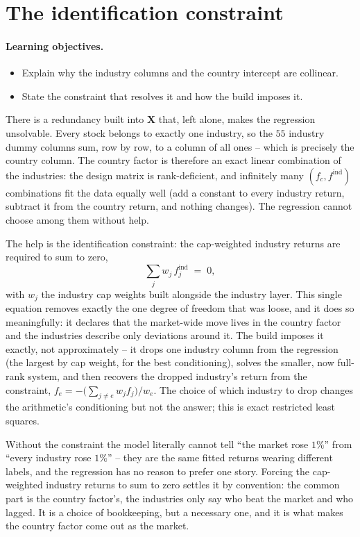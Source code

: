 \documentclass[11pt]{article}
\theoremstyle{definition}
\theoremstyle{plain}
\theoremstyle{remark}
\newcommand{\Xmat}{\mathbf{X}}
\begin{document}
\section{The identification constraint}\label{sec:constraint}

\paragraph{Learning objectives.}
\begin{itemize}[leftmargin=1.4em,topsep=2pt]
  \item Explain why the industry columns and the country intercept are collinear.
  \item State the constraint that resolves it and how the build imposes it.
\end{itemize}

There is a redundancy built into $\Xmat$ that, left alone, makes the regression unsolvable. Every stock belongs to exactly one industry, so the $55$ industry dummy columns sum, row by row, to a column of all ones -- which is precisely the country column. The country factor is therefore an exact linear combination of the industries: the design matrix is rank-deficient, and infinitely many $(f_c, f^{\text{ind}})$ combinations fit the data equally well (add a constant to every industry return, subtract it from the country return, and nothing changes). The regression cannot choose among them without help.

The help is the identification constraint: the cap-weighted industry returns are required to sum to zero,
\[
\sum_{j} w_j\, f^{\text{ind}}_j \;=\; 0 ,
\]
with $w_j$ the industry cap weights built alongside the industry layer. This single equation removes exactly the one degree of freedom that was loose, and it does so meaningfully: it declares that the market-wide move lives in the country factor and the industries describe only deviations around it. The build imposes it exactly, not approximately -- it drops one industry column from the regression (the largest by cap weight, for the best conditioning), solves the smaller, now full-rank system, and then recovers the dropped industry's return from the constraint, $f_e = -\big(\sum_{j\neq e} w_j f_j\big)/w_e$. The choice of which industry to drop changes the arithmetic's conditioning but not the answer; this is exact restricted least squares.

\begin{intuition}
Without the constraint the model literally cannot tell ``the market rose $1\%$'' from ``every industry rose $1\%$'' -- they are the same fitted returns wearing different labels, and the regression has no reason to prefer one story. Forcing the cap-weighted industry returns to sum to zero settles it by convention: the common part is the country factor's, the industries only say who beat the market and who lagged. It is a choice of bookkeeping, but a necessary one, and it is what makes the country factor come out as the market.
\end{intuition}
\end{document}
